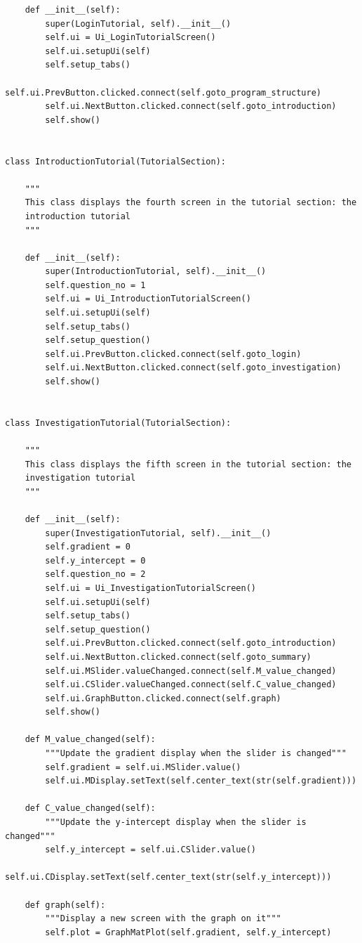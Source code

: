 \documentclass{article}
\begin{document}
\begin{lstlisting}
    def __init__(self):
        super(LoginTutorial, self).__init__()
        self.ui = Ui_LoginTutorialScreen()
        self.ui.setupUi(self)
        self.setup_tabs()
        self.ui.PrevButton.clicked.connect(self.goto_program_structure)
        self.ui.NextButton.clicked.connect(self.goto_introduction)
        self.show()


class IntroductionTutorial(TutorialSection):

    """
    This class displays the fourth screen in the tutorial section: the
    introduction tutorial
    """

    def __init__(self):
        super(IntroductionTutorial, self).__init__()
        self.question_no = 1
        self.ui = Ui_IntroductionTutorialScreen()
        self.ui.setupUi(self)
        self.setup_tabs()
        self.setup_question()
        self.ui.PrevButton.clicked.connect(self.goto_login)
        self.ui.NextButton.clicked.connect(self.goto_investigation)
        self.show()


class InvestigationTutorial(TutorialSection):

    """
    This class displays the fifth screen in the tutorial section: the
    investigation tutorial
    """

    def __init__(self):
        super(InvestigationTutorial, self).__init__()
        self.gradient = 0
        self.y_intercept = 0
        self.question_no = 2
        self.ui = Ui_InvestigationTutorialScreen()
        self.ui.setupUi(self)
        self.setup_tabs()
        self.setup_question()
        self.ui.PrevButton.clicked.connect(self.goto_introduction)
        self.ui.NextButton.clicked.connect(self.goto_summary)
        self.ui.MSlider.valueChanged.connect(self.M_value_changed)
        self.ui.CSlider.valueChanged.connect(self.C_value_changed)
        self.ui.GraphButton.clicked.connect(self.graph)
        self.show()

    def M_value_changed(self):
        """Update the gradient display when the slider is changed"""
        self.gradient = self.ui.MSlider.value()
        self.ui.MDisplay.setText(self.center_text(str(self.gradient)))

    def C_value_changed(self):
        """Update the y-intercept display when the slider is changed"""
        self.y_intercept = self.ui.CSlider.value()
        self.ui.CDisplay.setText(self.center_text(str(self.y_intercept)))

    def graph(self):
        """Display a new screen with the graph on it"""
        self.plot = GraphMatPlot(self.gradient, self.y_intercept)



\end{lstlisting}
\end{document}
